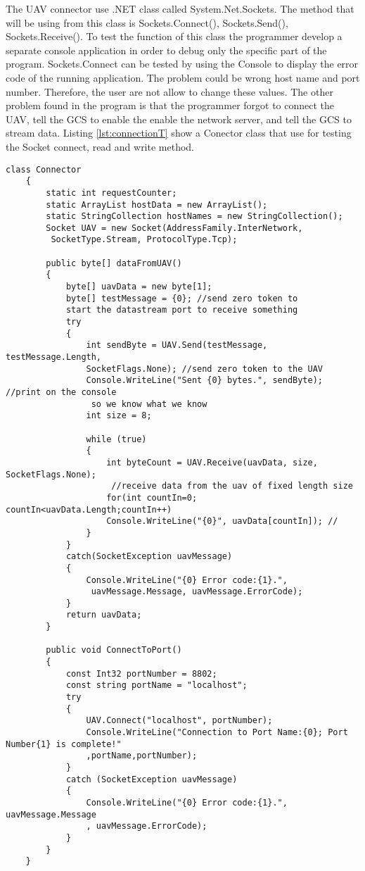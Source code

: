 The UAV connector use .NET class called System.Net.Sockets. The method that will be using from this class is Sockets.Connect(), Sockets.Send(), Sockets.Receive(). To test the function of this class the programmer develop a separate console application in order to debug only the specific part of the program. Sockets.Connect can be tested by using the Console to display the error code of the running application. The problem could be wrong host name and port number. Therefore, the user are not allow to change these values. The other problem found in the program is that the programmer forgot to connect the UAV, tell the GCS to enable the enable the network server, and tell the GCS to stream data. Listing \ref{lst:connectionT} show a Conector class that use for testing the Socket connect, read and write method.
\begin{lstlisting}[caption=the class that use to test the connection to the UAV,label=lst:connectionT]
    class Connector
    {
        static int requestCounter;
        static ArrayList hostData = new ArrayList();
        static StringCollection hostNames = new StringCollection();
        Socket UAV = new Socket(AddressFamily.InterNetwork,
         SocketType.Stream, ProtocolType.Tcp);

        public byte[] dataFromUAV()
        {
            byte[] uavData = new byte[1];
            byte[] testMessage = {0}; //send zero token to 
            start the datastream port to receive something
            try
            {
                int sendByte = UAV.Send(testMessage, testMessage.Length, 
                SocketFlags.None); //send zero token to the UAV
                Console.WriteLine("Sent {0} bytes.", sendByte); //print on the console
                 so we know what we know
                int size = 8;

                while (true)
                {
                    int byteCount = UAV.Receive(uavData, size, SocketFlags.None);
                     //receive data from the uav of fixed length size
                    for(int countIn=0; countIn<uavData.Length;countIn++)
                    Console.WriteLine("{0}", uavData[countIn]); //
                }
            }
            catch(SocketException uavMessage)
            {
                Console.WriteLine("{0} Error code:{1}.",
                 uavMessage.Message, uavMessage.ErrorCode);
            }
            return uavData;
        }

        public void ConnectToPort()
        {
            const Int32 portNumber = 8802;
            const string portName = "localhost";
            try
            {
                UAV.Connect("localhost", portNumber);
                Console.WriteLine("Connection to Port Name:{0}; Port Number{1} is complete!"
                ,portName,portNumber);
            }
            catch (SocketException uavMessage)
            {
                Console.WriteLine("{0} Error code:{1}.", uavMessage.Message
                , uavMessage.ErrorCode);
            }
        }
    }
\end{lstlisting}
